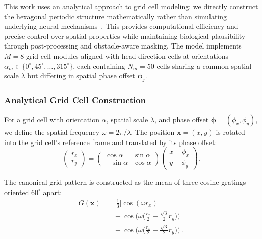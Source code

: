 \documentclass[conference]{IEEEtran}
\begin{document}
This work uses an analytical approach to grid cell modeling: we directly construct the hexagonal periodic structure mathematically rather than simulating underlying neural mechanisms~\cite{blair2007scale}. This provides computational efficiency and precise control over spatial properties while maintaining biological plausibility through post-processing and obstacle-aware masking. The model implements $M = 8$ grid cell modules aligned with head direction cells at orientations $\alpha_m \in \{0^\circ, 45^\circ, \ldots, 315^\circ\}$, each containing $N_m = 50$ cells sharing a common spatial scale $\lambda$ but differing in spatial phase offset $\boldsymbol{\phi}_j$.

\subsubsection{Analytical Grid Cell Construction}

For a grid cell with orientation $\alpha$, spatial scale $\lambda$, and phase offset $\boldsymbol{\phi} = (\phi_x, \phi_y)$, we define the spatial frequency $\omega = 2\pi/\lambda$. The position $\mathbf{x} = (x, y)$ is rotated into the grid cell's reference frame and translated by its phase offset:
\begin{equation}
\begin{pmatrix} r_x \\ r_y \end{pmatrix} 
= \begin{pmatrix} \cos\alpha & \sin\alpha \\ -\sin\alpha & \cos\alpha \end{pmatrix}
\begin{pmatrix} x - \phi_x \\ y - \phi_y \end{pmatrix}.
\label{eq:rotation}
\end{equation}

The canonical grid pattern is constructed as the mean of three cosine gratings oriented $60^\circ$ apart:
\begin{equation}
\begin{split}
G(\mathbf{x}) &= \frac{1}{3}\Big[\cos(\omega r_x) \\
&\quad + \cos\Big(\omega \big(\tfrac{r_x}{2} + \tfrac{\sqrt{3}}{2} r_y\big)\Big) \\
&\quad + \cos\Big(\omega \big(\tfrac{r_x}{2} - \tfrac{\sqrt{3}}{2} r_y\big)\Big)\Big].
\end{split}
\label{eq:canonical-grid}
\end{equation}
\end{document}
